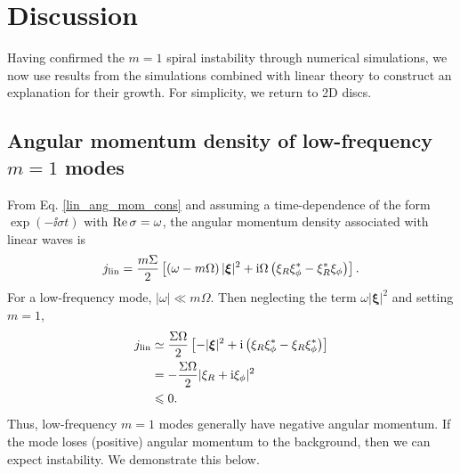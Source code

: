 \section{Discussion}\label{discussions} 
Having confirmed the $m=1$ spiral instability through numerical
simulations, we now use results from the simulations combined with
linear theory to construct an explanation for their growth. For
simplicity, we return to 2D discs. 




\subsection{Angular momentum density of  low-frequency $m=1$ modes}
From Eq. \ref{lin_ang_mom_cons} and assuming a time-dependence of the
form $\exp{(-\ii \sigma t)}$ with $\operatorname{Re}{\sigma} = \omega$,  
the angular momentum density associated with linear waves is
\begin{align}
  j_\mathrm{lin} = \frac{m\Sigma}{2}\left[\left(\omega -
      m\Omega\right)|\bm{\xi}|^2 + \mathrm{i}\Omega\left(\xi_R\xi_\phi^* -
      \xi_R^*\xi_\phi\right)\right].  
\end{align}
For a low-frequency mode, $|\omega|\ll m\Omega$. Then neglecting the
term $\omega|\bm{\xi}|^2$ and setting $m=1$,
\begin{align}
  j_\mathrm{lin} &\simeq \frac{\Sigma\Omega}{2}\left[-|\bm{\xi}|^2 + \mathrm{i}\left(\xi_R\xi_\phi^* -
      \xi_R\xi_\phi^*\right)\right]\notag\\
  & = -\frac{\Sigma\Omega}{2}|\xi_R + \mathrm{i}\xi_\phi|^2\notag\\
  & \leqslant 0.
\end{align}
Thus, low-frequency $m=1$ modes generally have negative
angular momentum. If the mode loses (positive) angular momentum
to the background, then we can expect instability. We demonstrate
this below. 

